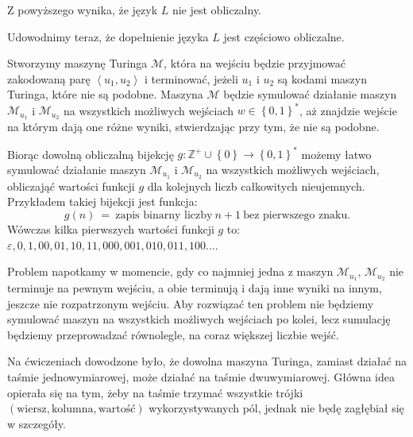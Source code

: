 \documentclass[12pt]{article}
\begin{document}
	\medskip
	
	Z powyższego wynika, że język \(L\) nie jest obliczalny.
	
	\bigskip
	
	Udowodnimy teraz, że dopełnienie języka \(L\) jest częściowo obliczalne.
	
	\medskip
	
	Stworzymy maszynę Turinga \(\mathcal{M}\), która na wejściu będzie
	przyjmować zakodowaną parę \(\left\langle u_{1}, u_{2} \right\rangle\) i
	terminować, jeżeli \(u_{1}\) i \(u_{2}\) są kodami maszyn Turinga, które nie
	są podobne. Maszyna \(\mathcal{M}\) będzie symulować działanie maszyn
	\(\mathcal{M}_{u_{1}}\) i \(\mathcal{M}_{u_{2}}\) na wszystkich możliwych
	wejściach \(w \in \left\{ 0, 1 \right\} ^ {\ast}\), aż znajdzie wejście na
	którym dają one różne wyniki, stwierdzając przy tym, że nie są podobne.
	
	\medskip
	
	Biorąc dowolną obliczalną bijekcję \(g : \mathbb{Z}^{+} \cup \left\{ 0
	\right\} \rightarrow \left\{ 0, 1 \right\} ^ {\ast}\) możemy łatwo symulować
	działanie maszyn \(\mathcal{M}_{u_{1}}\) i \(\mathcal{M}_{u_{2}}\) na
	wszystkich możliwych wejściach, obliczająć wartości funkcji \(g\) dla
	kolejnych liczb całkowitych nieujemnych. Przykładem takiej bijekcji jest
	funkcja:
	\[ g \left( n \right) \ = \ \text{zapis binarny liczby} \ n + 1 \ \text{bez
	pierwszego znaku.} \]
	Wówczas kilka pierwszych wartości funkcji \(g\) to: \(\varepsilon, 0, 1, 00,
	01, 10, 11, 000, 001, 010, 011, 100 \ldots\).
	
	\medskip
	
	Problem napotkamy w momencie, gdy co najmniej jedna z maszyn
	\(\mathcal{M}_{u_{1}}\), \(\mathcal{M}_{u_{2}}\) nie terminuje na pewnym
	wejściu, a obie terminują i dają inne wyniki na innym, jeszcze nie
	rozpatrzonym wejściu. Aby rozwiązać ten problem nie będziemy symulować
	maszyn na wszystkich możliwych wejściach po kolei, lecz sumulację będziemy
	przeprowadzać równolegle, na coraz większej liczbie wejść.
	
	\medskip
	
	Na ćwiczeniach dowodzone było, że dowolna maszyna Turinga, zamiast działać
	na taśmie jednowymiarowej, może działać na taśmie dwuwymiarowej. Główna idea
	opierała się na tym, żeby na taśmie trzymać wszystkie trójki \(\left(
	\text{wiersz}, \text{kolumna}, \text{wartość} \right)\) wykorzystywanych
	pól, jednak nie będę zagłębiał się w szczegóły.
	
	\medskip
	
\end{document}
